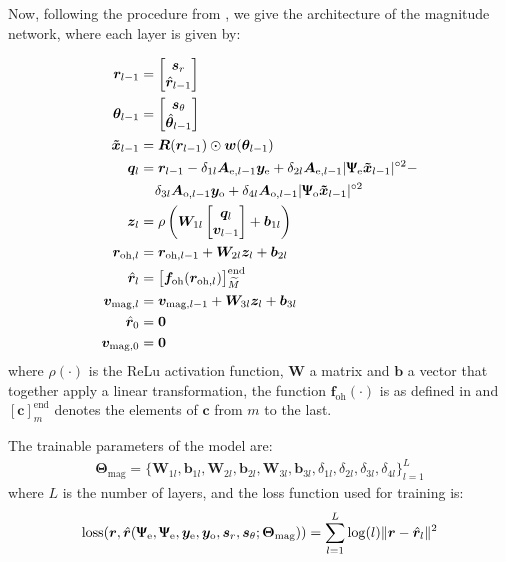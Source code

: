 Now, following the procedure from \cite{Neev_2019}, we give the architecture of the magnitude network, where each layer is given by:

\begin{align}
	\bm{r}_{l-1} &= \begin{bmatrix}\bm s_r\\\hat{\bm r}_{l-1}\end{bmatrix}\\
	\bm{\theta}_{l-1} &= \begin{bmatrix}\bm s_\theta\\\hat{\bm \theta}_{l-1}\end{bmatrix}\\
	\bm{\tilde{x}}_{l-1}&=\bm R(\bm{r}_{l-1})\odot\bm w(\bm\theta_{l-1})\\
	\bm q_l& = \bm{r}_{l-1} -\delta_{1l}\bm A_{\text{e},l-1}\bm y_\text{e} +\delta_{2l}\bm A_{\text{e},l-1}|\bm{\bm{\Uppsi}_\text{e}\tilde{x}}_{l-1}|^{\circ2}-\nonumber\\
	&\;\;\;\;\delta_{3l}\bm A_{\text{o},l-1}\bm y_\text{o} +\delta_{4l}\bm A_{\text{o},l-1}|\bm{\bm{\Uppsi}_\text{o}\tilde{x}}_{l-1}|^{\circ2}\\
	\bm z_l&=\rho\left( \bm W_{1l}\begin{bmatrix}\bm q_l\\\bm v_{l-1}\end{bmatrix}+\bm b_{1l}\right)\\
	\bm{r}_{\text{oh},l} &= \bm{r}_{\text{oh},l-1}+\bm W_{2l}\bm z_l+\bm b_{2l}\\
	\hat{\bm{r}}_{l} &= \bigl[\bm f_{\text{oh}}(\bm{r}_{\text{oh},l})\bigr]_{\widetilde{M}}^{\text{end}}\\
	\bm v_{\text{mag},l}&=\bm v_{\text{mag},l-1}+\bm W_{3l}\bm z_l+\bm b_{3l}\\
	\hat{\bm{r}}_{0} &= \bm 0\\
	\bm v_{\text{mag},0}&=\bm 0\\
\end{align}
where $\rho(\cdot)$ is the ReLu activation function, $\bm W$ a matrix and $\bm b$ a vector that together apply a linear transformation,  the function $\bm f_{\text{oh}}(\cdot)$ is as defined in \cite{Neev_2019} and $[\bm c]_m^\text{end}$ denotes the elements of $\bm c$ from $m$ to the last.

The trainable parameters of the model are:
\begin{align}
	\bm \Theta_\text{mag} = \bigl\{\bm W_{1l},\bm b_{1l},\bm W_{2l},\bm b_{2l},\bm W_{3l},\bm b_{3l},\delta_{1l},\delta_{2l},\delta_{3l},\delta_{4l}  \bigr\}_{l=1}^L
\end{align}
where $L$ is the number of layers, and the loss function used for training is:
\begin{align}
	\text{loss}(\bm r, \hat{\bm r}(\bm{\Uppsi}_\text{e},\bm{\Uppsi}_\text{e},\bm y_\text{e},\bm y_\text{o},\bm s_r,\bm s_\theta;\bm \Theta_\text{mag}))=\sum_{l=1}^L\log(l)\lVert \bm r-\hat{\bm{r}}_{l}\rVert^2
\end{align}


